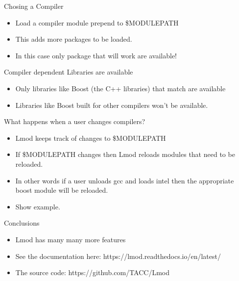 \documentclass{beamer}
\begin{document}
\begin{frame}{Chosing a Compiler}
    \begin{itemize}
      \item Load a compiler module prepend to \$MODULEPATH
      \item This adds more packages to be loaded.
      \item In this case only package that will work are available!
    \end{itemize}
\end{frame}

\begin{frame}{Compiler dependent Libraries are available}
    \begin{itemize}
      \item Only libraries like Boost (the C++ libraries) that match
        are available
      \item Libraries like Boost built for other compilers won't be available. 
    \end{itemize}
\end{frame}

\begin{frame}{What happens when a user changes compilers?}
    \begin{itemize}
      \item Lmod keeps track of changes to \$MODULEPATH
      \item If \$MODULEPATH changes then Lmod reloads modules that
        need to be reloaded.
      \item In other words if a user unloads gcc and loads intel
        then the appropriate boost module will be reloaded.
      \item Show example.
    \end{itemize}
\end{frame}


\begin{frame}{Conclusions}
    \begin{itemize}
      \item Lmod has many many more features 
      \item See the documentation here:
        https://lmod.readthedocs.io/en/latest/
      \item The source code: https://github.com/TACC/Lmod
    \end{itemize}
\end{frame}
\end{document}
